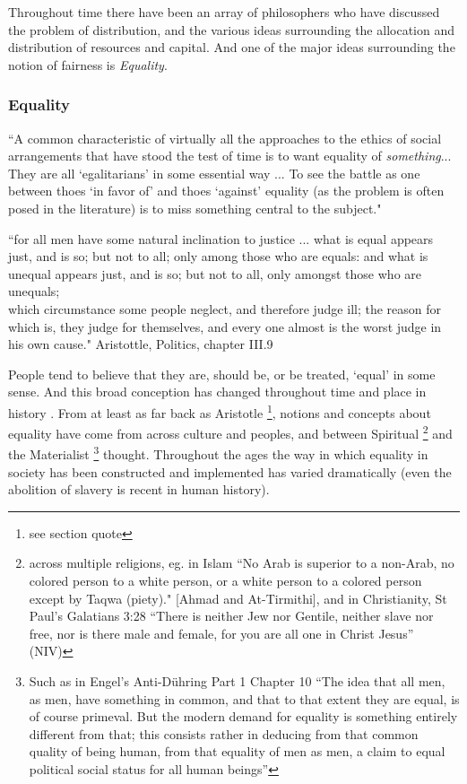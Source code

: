 Throughout time there have been an array of philosophers who have discussed the problem of distribution, and the various ideas surrounding the allocation and distribution of resources and capital. And one of the major ideas surrounding the notion of fairness is \textit{Equality}.

\subsubsection{Equality}

\begin{displayquote}
``A common characteristic of virtually all the approaches to the ethics of social arrangements that have stood the test of time is to want equality of \textit{something}... They are all `egalitarians' in some essential way ... To see the battle as one between thoes `in favor of' and thoes `against' equality (as the problem is often posed in the literature) is to miss something central to the subject."\cite{18084} 
\end{displayquote}

\begin{displayquote}
``for all men have some natural inclination to justice ... what is equal appears just, and is so; but not to all; only among those who are equals: and what is unequal appears just, and is so; but not to all, only amongst those who are unequals;\\
which circumstance some people neglect, and therefore judge ill; the reason for which is, they judge for themselves, and every one almost is the worst judge in his own cause." Aristottle, Politics, chapter III.9\cite{AristotleGutenberg}
\end{displayquote}


People tend to believe that they are, should be, or be treated, `equal' in some sense.
And this broad conception has changed throughout time and place in history \cite{themeaningofequalitycapaldi}.
From at least as far back as Aristotle \cite{AristotleGutenberg}\footnote{see section quote}, notions and concepts about equality have come from across culture and peoples, and between Spiritual \footnote{across multiple religions, eg. in Islam ``No Arab is superior to a non-Arab, no colored person to a  white person, or a white person to a colored person except by Taqwa (piety)." [Ahmad and At-Tirmithi], and in Christianity, St Paul's Galatians 3:28 ``There is neither Jew nor Gentile, neither slave nor free, nor is there male and female, for you are all one in Christ Jesus'' (NIV) } and the Materialist \footnote{Such as in Engel's Anti-D\"{u}hring Part 1 Chapter 10 ``The idea that all men, as men, have something in common, and that to that extent they are equal, is of course primeval. But the modern demand for equality is something entirely different from that; this consists rather in deducing from that common quality of being human, from that equality of men as men, a claim to equal political social status for all human beings''} thought.
Throughout the ages the way in which equality in society has been constructed and implemented has varied dramatically (even the abolition of slavery is recent in human history).

